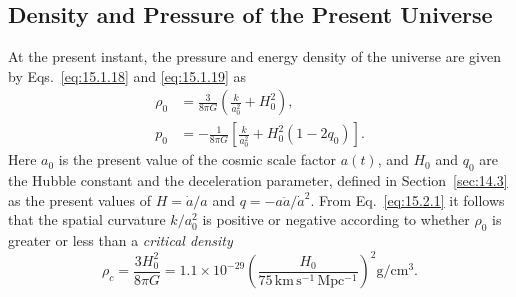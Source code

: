
\subsection{Density and Pressure of the Present Universe}\label{sec:15.2}

At the present instant, the pressure and energy density of the universe are
given by Eqs.~\eqref{eq:15.1.18} and \eqref{eq:15.1.19} as
\begin{align}
  \rho_0
  &=
  \frac{3}{8\pi G}
  \left(\frac{k}{a_0^2}+H_0^2\right),
  \tag{15.2.1}\label{eq:15.2.1}\\
  p_0
  &=
  -\frac{1}{8\pi G}
  \left[
    \frac{k}{a_0^2}+H_0^2(1-2q_0)
  \right].
  \tag{15.2.2}\label{eq:15.2.2}
\end{align}
Here \(a_0\) is the present value of the cosmic scale factor \(a(t)\), and
\(H_0\) and \(q_0\) are the Hubble constant and the deceleration parameter,
defined in Section~\ref{sec:14.3} as the present values of
\(H=\dot a/a\) and \(q=-a\ddot a/\dot a^2\). From
Eq.~\eqref{eq:15.2.1} it follows that the spatial curvature \(k/a_0^2\)
is positive or negative according to whether \(\rho_0\) is greater or less
than a \emph{critical density}
\begin{equation}
  \rho_c
  =
  \frac{3H_0^2}{8\pi G}
  =
  1.1\times10^{-29}
  \left(
    \frac{H_0}{75\,\mathrm{km\,s^{-1}\,Mpc^{-1}}}
  \right)^2
  \mathrm{g/cm^3}.
  \tag{15.2.3}\label{eq:15.2.3}
\end{equation}

